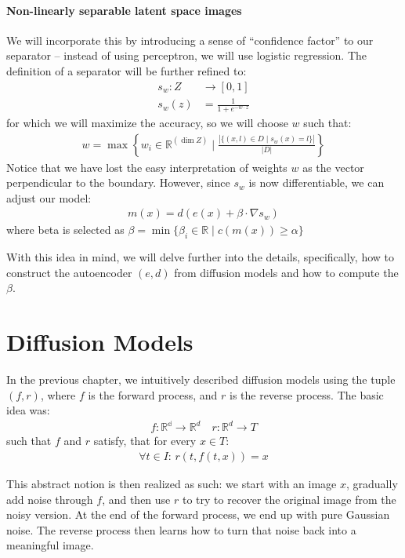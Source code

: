 \paragraph{Non-linearly separable latent space images}
We will incorporate this by introducing a sense of \enquote{confidence factor} to our separator -- instead of using perceptron, we will use logistic regression. The definition of a separator will be further refined to:
\begin{align*}
    s_w : Z &\to [0,1]\\
    s_w(z) &= \frac{1}{1 + e^{-w \cdot z}}
\end{align*}
for which we will maximize the accuracy, so we will choose $w$ such that:
\begin{align*}
    w = \max\left\{ w_i \in \mathbb{R}^{(\dim Z)} \mid \frac{|\{ (x, l) \in D \mid s_w(x) = l\}|}{|D|} \right\}
\end{align*}
Notice that we have lost the easy interpretation of weights $w$ as the vector perpendicular to the boundary. However,
since $s_w$ is now differentiable, we can adjust our model:
\begin{align*}
    m(x) = d(e(x) + \beta \cdot \nabla s_w)
\end{align*}
where beta is selected as $\beta = \min \{ \beta_i \in \mathbb{R} \mid c(m(x)) \geq \alpha \}$

With this idea in mind, we will delve further into the details, specifically, how to construct the autoencoder $(e,d)$ from diffusion models and how to compute the $\beta$.


\section{Diffusion Models}

In the previous chapter, we intuitively described diffusion models using the tuple $(f, r)$, where $f$ is the forward process, and $r$ is the reverse process. The basic idea was:
\begin{align*}
    f : \mathbb{R^d} \to \mathbb{R}^d \quad r : \mathbb{R}^d \to T
\end{align*}
such that $f$ and $r$ satisfy, that for every $x \in T$:
\begin{align*}
    \forall t \in I : \, r(t, f(t, x)) = x
\end{align*}

This abstract notion is then realized as such: we start with an image $x$, gradually add noise through $f$, and then use $r$ to try to recover the original image from the noisy version. At the end of the forward process, we end up with pure Gaussian noise. The reverse process then learns how to turn that noise back into a meaningful image.

